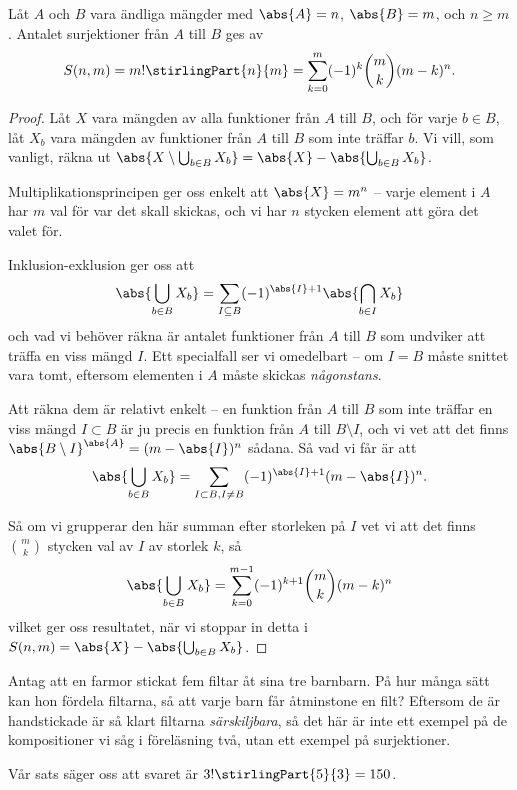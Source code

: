 \documentclass[nobib]{tufte-handout}
\begin{document}
\begin{theorem}\label{theorem_count_surjections}
  Låt $A$ och $B$ vara ändliga mängder med $\abs{A} = n$, $\abs{B} = m$, och $n \geq m$. Antalet surjektioner från $A$ till $B$ ges av
  $$S(n,m) = m!\stirlingPart{n}{m} = \sum_{k=0}^{m} (-1)^k \binom{m}{k}(m-k)^n.$$

  \begin{proof}
    Låt $X$ vara mängden av alla funktioner från $A$ till $B$, och för varje $b \in B$, låt $X_b$ vara mängden av funktioner från $A$ till $B$ som inte träffar $b$. Vi vill, som vanligt, räkna ut $\abs{X \setminus \bigcup_{b\in B} X_b} = \abs{X} - \abs{\bigcup_{b\in B} X_b}$.

    Multiplikationsprincipen ger oss enkelt att $\abs{X} = m^n$ -- varje element i $A$ har $m$ val för var det skall skickas, och vi har $n$ stycken element att göra det valet för.

    Inklusion-exklusion ger oss att
    $$\abs{\bigcup_{b\in B} X_b} = \sum_{I \subseteq B} (-1)^{\abs{I} + 1}\abs{\bigcap_{b \in I} X_b}$$
    och vad vi behöver räkna är antalet funktioner från $A$ till $B$ som undviker att träffa en viss mängd $I$. Ett specialfall ser vi omedelbart -- om $I = B$ måste snittet vara tomt, eftersom elementen i $A$ måste skickas \emph{någonstans}.

    Att räkna dem är relativt enkelt -- en funktion från $A$ till $B$ som inte träffar en viss mängd $I \subset B$ är ju precis en funktion från $A$ till $B \setminus I$, och vi vet att det finns $\abs{B \setminus I}^{\abs{A}} = (m - \abs{I})^n$ sådana. Så vad vi får är att
    $$\abs{\bigcup_{b\in B} X_b} = \sum_{I \subset B, I \neq B} (-1)^{\abs{I} + 1}(m - \abs{I})^n.$$

    Så om vi grupperar den här summan efter storleken på $I$ vet vi att det finns $\binom{m}{k}$ stycken val av $I$ av storlek $k$, så 
    $$\abs{\bigcup_{b\in B} X_b} = \sum_{k=0}^{m-1} (-1)^{k + 1}\binom{m}{k}(m - k)^n$$
    vilket ger oss resultatet, när vi stoppar in detta i $S(n,m) = \abs{X} - \abs{\bigcup_{b\in B} X_b}$.
  \end{proof}
\end{theorem}

\begin{example}
  Antag att en farmor stickat fem filtar åt sina tre barnbarn. På hur många sätt kan hon fördela filtarna, så att varje barn får åtminstone en filt? Eftersom de är handstickade är så klart filtarna \emph{särskiljbara}, så det här är inte ett exempel på de kompositioner vi såg i föreläsning två, utan ett exempel på surjektioner.

  Vår sats säger oss att svaret är $3!\stirlingPart{5}{3} = 150$.
\end{example}
\end{document}
